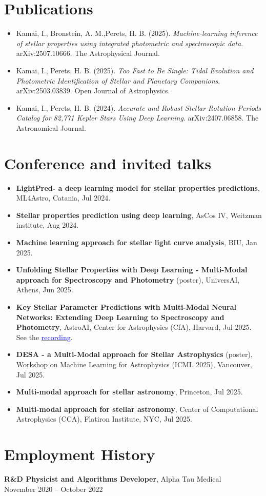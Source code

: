 \documentclass[11pt]{article}
\begin{document}
\section*{Publications}
\begin{itemize}[leftmargin=*]
  \item Kamai, I., Bronstein, A. M.,Perets, H. B. (2025). \textit{Machine-learning inference of stellar properties using integrated photometric and spectroscopic data}. arXiv:2507.10666. The Astrophysical Journal.
  \item Kamai, I., Perets, H. B. (2025). \textit{Too Fast to Be Single: Tidal Evolution and Photometric Identification of Stellar and Planetary Companions}.
  arXiv:2503.03839. Open Journal of Astrophysics.
  \item Kamai, I., Perets, H. B. (2024). \textit{Accurate and Robust Stellar Rotation Periods Catalog for 82,771 Kepler Stars Using Deep Learning}. arXiv:2407.06858. The Astronomical Journal.
\end{itemize}

\section*{Conference and invited talks}
\begin{itemize}[leftmargin=*]
\item \textbf{LightPred- a deep learning model for stellar properties predictions}, ML4Astro, Catania, Jul 2024.
\item \textbf{Stellar properties prediction using deep learning}, AsCos IV, Weitzman institute, Aug 2024.
\item \textbf{Machine learning approach for stellar light curve analysis}, BIU, Jan 2025.
\item \textbf{Unfolding Stellar Properties with Deep Learning -
 Multi-Modal approach for Spectroscopy and Photometry
} (poster), UniversAI, Athens, Jun 2025.
\item \textbf{Key Stellar Parameter Predictions with Multi-Modal Neural Networks: Extending Deep Learning to Spectroscopy and Photometry}, AstroAI, Center for Astrophysics (CfA), Harvard, Jul 2025. See the \href{https://www.youtube.com/watch?v=Xz4AwGFamLY&t=461s}{\textcolor{blue}{recording}}.

\item \textbf{DESA - a Multi-Modal approach for Stellar Astrophysics} (poster), Workshop on Machine Learning for Astrophysics (ICML 2025), Vancouver, Jul 2025.
\item \textbf{Multi-modal approach for stellar astronomy}, Princeton, Jul 2025.
\item \textbf{Multi-modal approach for stellar astronomy}, Center of Computational Astrophysics (CCA), Flatiron Institute, NYC, Jul 2025.
\end{itemize}

\section*{Employment History}
\textbf{R\&D Physicist and Algorithms Developer}, Alpha Tau Medical \\
November 2020 -- October 2022
\end{document}
